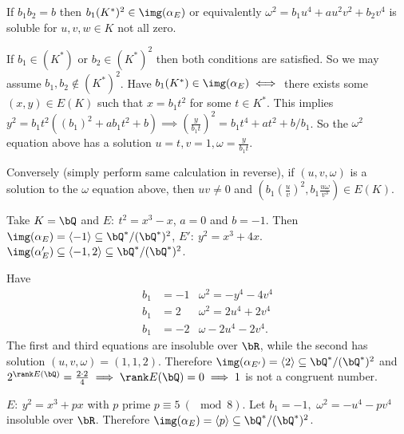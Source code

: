 \begin{lem}\label{lem:16-5}
	If $b_1b_2 = b$ then $b_1(K^*)^2 \in \img(\alpha_E)$ or equivalently $\omega^2 = b_1u^4 + au^2v^2 + b_2v^4$ is soluble for $u,v,w \in K$ not all zero.
\end{lem}
\begin{prf}
	If $b_1 \in (K^*)$ or $b_2 \in (K^*)^2$ then both conditions are satisfied. So we may assume $b_1,b_2 \not\in (K^*)^2$. Have $b_1(K^*) \in \img(\alpha_E) \iff$ there exists some $(x,y) \in E(K)$ such that $x = b_1t^2$ for some $t \in K^*$. This implies $y^2 = b_1t^2\left((b_1)^2 + ab_1t^2 + b\right)\implies \left(\frac{y}{b_1t}\right)^2 = b_1t^4 + at^2 + b/b_1$. So the $\omega^2$ equation above has a solution $u = t, v = 1, \omega = \frac{y}{b_1t}$.

	Conversely (simply perform same calculation in reverse), if $(u,v,\omega)$ is a solution to the $\omega$ equation above, then $uv \neq 0$ and $\left(b_1\left(\frac{u}{v}\right)^2,b_1\frac{u\omega}{v^3}\right) \in E(K)$.
\end{prf}

\begin{example}
	Take $K = \bQ$ and $E:~ t^2 = x^3 - x$, $a = 0$ and $b = -1$. Then $\img(\alpha_E) = \langle -1 \rangle \subseteq \bQ^*/(\bQ^*)^2$, $E':~ y^2 = x^3 + 4x$. $\img(\alpha_E') \subseteq \langle -1,2 \rangle \subseteq \bQ^*/(\bQ^*)^2$.

	Have 
	\begin{align*}
		b_1 &= -1 & \omega^2 = -y^4 - 4v^4 \\
		b_1 &= 2 & \omega^2 = 2u^4 + 2v^4 \\
		b_1 &= -2 & \omega -2u^4 - 2v^4.
	\end{align*}
	The first and third equations are insoluble over $\bR$, while the second has solution $(u,v,\omega) = (1,1,2)$. Therefore $\img(\alpha_{E'}) = \langle 2 \rangle \subseteq \bQ^*/(\bQ^*)^2$ and $2^{\rank E(\bQ)} = \frac{2 \cdot 2}{4} \implies \rank E(\bQ) = 0 \implies 1$ is not a congruent number.
\end{example}

\begin{example}
	$E:~ y^2 = x^3 + px$ with $p$ prime $p \equiv 5 ~(\mod 8)$. Let $b_1 = -1,$ $\omega^2 = -u^4 - pv^4$ insoluble over $\bR$. Therefore $\img(\alpha_E) = \langle p \rangle\subseteq \bQ^*/(\bQ^*)^2$.
\end{example}



